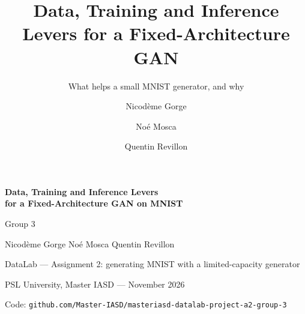 \documentclass[sigconf,nonacm,balance=false]{acmart}
\begin{document}
\begin{titlepage}
\centering
\vspace*{4.5cm}
{\LARGE\bfseries Data, Training and Inference Levers\\[4pt] for a Fixed-Architecture GAN on MNIST\par}
\vspace{1.4cm}
{\Large Group 3\par}
\vspace{0.5cm}
{\large Nicod\`eme Gorge \qquad No\'e Mosca \qquad Quentin Revillon\par}
\vspace{1.4cm}
{DataLab --- Assignment 2: generating MNIST with a limited-capacity generator\par}
\vspace{0.2cm}
{PSL University, Master IASD --- November 2026\par}
\vfill
{\small Code: \texttt{github.com/Master-IASD/masteriasd-datalab-project-a2-group-3}\par}
\end{titlepage}
\setcounter{page}{1}

\title{Data, Training and Inference Levers for a Fixed-Architecture GAN}
\subtitle{What helps a small MNIST generator, and why}

\author{Nicod\`eme Gorge}
\author{No\'e Mosca}
\author{Quentin Revillon}
\renewcommand{\shortauthors}{}




\maketitle









\renewcommand{\bibfont}{\normalsize}





\clearpage
\onecolumn
\appendix

\end{document}
